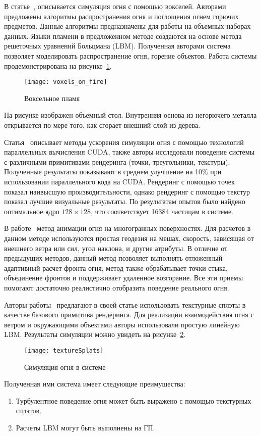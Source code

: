 В статье~\cite{Zhao2003VoxelsOF}, описывается симуляция огня с помощью вокселей.
Авторами предложены алгоритмы распространения огня и поглощения огнем горючих
предметов. Данные алгоритмы предназначены для работы на объемных наборах данных.
Языки пламени в предложенном методе создаются на основе метода решеточных
уравнений Больцмана (LBM). Полученная авторами система позволяет моделировать
распространение огня, горение объектов. Работа системы продемонстрирована на
рисунке~\ref{fig:voxelFire}.
\begin{figure}[htb]
	\centering
	\texttt{[image: voxels\_on\_fire]}
    \caption{Воксельное пламя}%
    \label{fig:voxelFire}
\end{figure}
На рисунке изображен объемный стол. Внутренняя основа из негорючего металла
открывается по мере того, как сгорает внешний слой из дерева.

Статья~\cite{Lyes2013FireAF} описывает методы ускорения симуляции огня с помощью
технологий параллельных вычисления CUDA, также авторы исследовали поведение
системы с различными примитивами рендеринга (точки, треугольники, текстуры).
Полученные результаты показывают в среднем улучшение на 10\% при использовании
параллельного кода на CUDA\@. Рендеринг с помощью точек показал наивысшую
производительности, однако рендеринг с помощью текстур показал лучшие визуальные
результаты. По результатам опытов было найдено оптимальное ядро $128 \times
128$, что соответствует 16384 частицам в системе.

В работе~\cite{MeshesOnFire} метод анимации огня на многогранных поверхностях.
Для расчетов в данном методе используются простая геодезия на мешах, скорость,
зависящая от внешнего ветра или сил, угол наклона, и другие атрибуты. В отличие
от предыдущих методов, данный метод позволяет выполнять отложенный адаптивный
расчет фронта огня, метод также обрабатывает точки стыка, объединение фронтов и
поддерживает удаленное возгорание. Все эти приемы помогают достаточно
реалистично отобразить поведение реального огня.

Авторы работы~\cite{FireSplats} предлагают в своей статье использовать
текстурные сплэты в качестве базового примитива рендеринга. Для реализации
взаимодействия огня с ветром и окружающими объектами авторы использовали простую
линейную LBM\@. Результаты симуляции можно увидеть на
рисунке~\ref{fig:textureSplats}.
\begin{figure}[htb]
	\centering
    \texttt{[image: textureSplats]}
    \caption{Симуляция огня в системе~\cite{FireSplats}}%
    \label{fig:textureSplats}
\end{figure}
Полученная ими система имеет следующие преимущества:
\begin{enumerate}
    \item Турбулентное поведение огня может быть выражено с помощью текстурных
        сплэтов.
    \item Расчеты LBM могут быть выполнены на ГП.
\end{enumerate}

